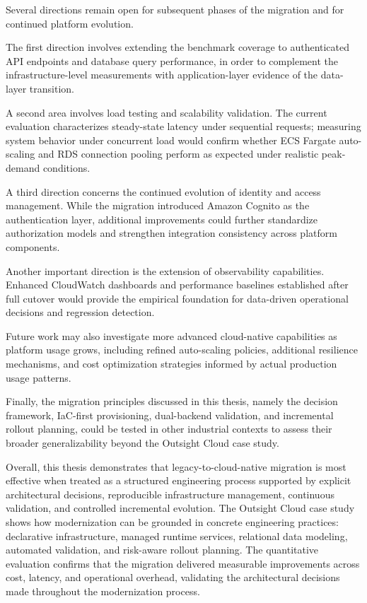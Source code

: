 Several directions remain open for subsequent phases of the migration and for continued platform evolution.

The first direction involves extending the benchmark coverage to authenticated API endpoints and database query performance, in order to complement the infrastructure-level measurements with application-layer evidence of the data-layer transition.

A second area involves load testing and scalability validation. The current evaluation characterizes steady-state latency under sequential requests; measuring system behavior under concurrent load would confirm whether ECS Fargate auto-scaling and RDS connection pooling perform as expected under realistic peak-demand conditions.

A third direction concerns the continued evolution of identity and access management. While the migration introduced Amazon Cognito as the authentication layer, additional improvements could further standardize authorization models and strengthen integration consistency across platform components.

Another important direction is the extension of observability capabilities. Enhanced CloudWatch dashboards and performance baselines established after full cutover would provide the empirical foundation for data-driven operational decisions and regression detection.

Future work may also investigate more advanced cloud-native capabilities as platform usage grows, including refined auto-scaling policies, additional resilience mechanisms, and cost optimization strategies informed by actual production usage patterns.

Finally, the migration principles discussed in this thesis, namely the decision framework, IaC-first provisioning, dual-backend validation, and incremental rollout planning, could be tested in other industrial contexts to assess their broader generalizability beyond the Outsight Cloud case study.

\medskip

Overall, this thesis demonstrates that legacy-to-cloud-native migration is most effective when treated as a structured engineering process supported by explicit architectural decisions, reproducible infrastructure management, continuous validation, and controlled incremental evolution. The Outsight Cloud case study shows how modernization can be grounded in concrete engineering practices: declarative infrastructure, managed runtime services, relational data modeling, automated validation, and risk-aware rollout planning. The quantitative evaluation confirms that the migration delivered measurable improvements across cost, latency, and operational overhead, validating the architectural decisions made throughout the modernization process.
